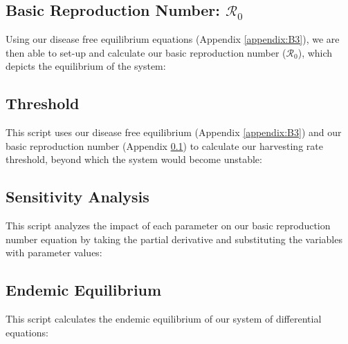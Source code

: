 \documentclass[12pt]{article}
\begin{document}
        \subsection{Basic Reproduction Number: $\mathscr{R}_0$}
        \label{appendix:B4}
        Using our disease free equilibrium equations (Appendix \ref{appendix:B3}), we are then able to set-up and calculate our basic reproduction number ($\mathscr{R}_0$), which depicts the equilibrium of the system:
        \begin{center}
            
        \end{center}
        
        \subsection{Threshold}
        \label{appendix:B5}
        This script uses our disease free equilibrium (Appendix \ref{appendix:B3}) and our basic reproduction number (Appendix \ref{appendix:B4}) to calculate our harvesting rate threshold, beyond which the system would become unstable:
        \begin{center}
            
        \end{center}
        
        \subsection{Sensitivity Analysis}
        This script analyzes the impact of each parameter on our basic reproduction number equation by taking the partial derivative and substituting the variables with parameter values:
        \label{appendix:B6}
        \begin{center}
            
        \end{center}
        
        \subsection{Endemic Equilibrium}
        \label{appendix:B7}
        This script calculates the endemic equilibrium of our system of differential equations:        
        \begin{center}
            
        \end{center}
\newpage
% 
% 
\printbibliography
\end{document}
